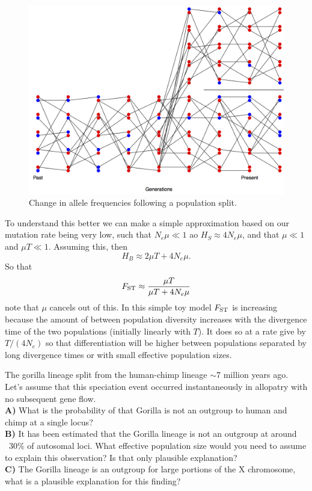 \begin{figure}
\begin{center}
\includegraphics[width= 0.8 \textwidth]{figures/drift_split.png}
\end{center}
\caption{Change in allele frequencies following a population split.} \label{fig:drift_split}  
\end{figure} 

To understand this better we can make a simple
approximation based on our mutation rate being very low, such that
$N_e \mu \ll 1$ ao $H_S \approx
4N_e\mu$, and that $\mu \ll 1$ and $\mu T \ll 1$. Assuming this, then  
\begin{equation}
H_B \approx 2 \mu T + 4N_e\mu. 
\end{equation}
So that 
\begin{equation}
\fst \approx \frac{ \mu T}{\mu T +  4N_e\mu }  %
\end{equation}
note that $\mu$ cancels out of this. In this simple toy model $F_{\mathrm{ST}}$
is increasing because the amount of between population diversity 
increases with the divergence time of the two populations (initially
linearly with $T$). It does so at a rate
give by $T/(4N_e)$ so that differentiation will be higher
between populations separated by long divergence times or with small
effective population sizes.

\begin{question}
The gorilla lineage split from the human-chimp lineage $\sim$7 million years ago. Let’s assume that this speciation event occurred instantaneously in allopatry with no subsequent gene flow. \\
{\bf A)}	What is the probability of that Gorilla is not an outgroup to human and chimp at a single locus?\\
{\bf B)}	It has been estimated that the Gorilla lineage is not an outgroup at around ~30\% of autosomal loci. What effective population size would you need to assume to explain this observation? Is that only plausible explanation?\\
{\bf C)}	The Gorilla lineage is an outgroup for large portions of the X chromosome, what is a plausible explanation for this finding?
\end{question}

